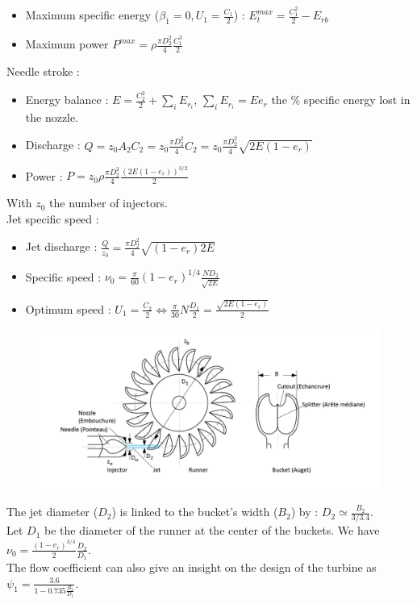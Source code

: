 \documentclass[../main.tex]{subfiles}
\begin{document}
\begin{itemize}
    \item Maximum specific energy ($\beta_{\overline{1}} = 0, U_1= \frac{C_1}{2}$) : $E_t^{max} = \frac{C_1^2}{2}-E_{rb}$
    \item Maximum power $P^{max} = \rho \frac{\pi D_2^2}{4} \frac{C_1^3}{2}$
\end{itemize}

Needle stroke : \begin{itemize}
    \item Energy balance : $E = \frac{C_2^2}{2} + \sum_i E_{r_i}$, $\sum_i E_{r_i} = E e_r$ the $\%$ specific energy lost in the nozzle.
    \item Discharge : $Q = z_0 A_2 C_2 = z_0 \frac{\pi D_2^2}{4}C_2 = z_0 \frac{\pi D_2^2}{4} \sqrt{2E(1-e_r)}$
    \item Power : $P = z_0 \rho \frac{\pi D_2^2}{4} \frac{(2E(1-e_r))^{3/2}}{2}$
\end{itemize}
With $z_0$ the number of injectors.\\

Jet specific speed : \begin{itemize}
    \item Jet discharge : $\frac{Q}{z_0} = \frac{\pi D_2^2}{4} \sqrt{(1-e_r) 2E}$
    \item Specific speed : $\nu_0 = \frac{\pi}{60} (1-e_r)^{1/4} \frac{ND_2}{\sqrt{2E}}$
    \item Optimum speed : $U_1 = \frac{C_2}{2}\Leftrightarrow \frac{\pi}{30} N \frac{D_1}{2} = \frac{\sqrt{2E(1-e_r)}}{2}$
\end{itemize}

\begin{figure}[hbt!]
    \centering
    \includegraphics[width=0.8\linewidth]{IMAGES/Hydraulic/IMG_0186.jpeg}
\end{figure}
The jet diameter ($D_2$) is linked to the bucket's width ($B_2$) by : $D_2 \simeq \frac{B_2}{3/3.4}$.\\
Let $D_1$ be the diameter of the runner at the center of the buckets. We have $\nu_0 = \frac{(1-e_r)^{3/4}}{2} \frac{D_2}{D_1}$.\\
The flow coefficient can also give an insight on the design of the turbine as $\psi_1 = \frac{3.6}{1-0.735 \frac{B_2}{D_1}}$.\\
\end{document}
